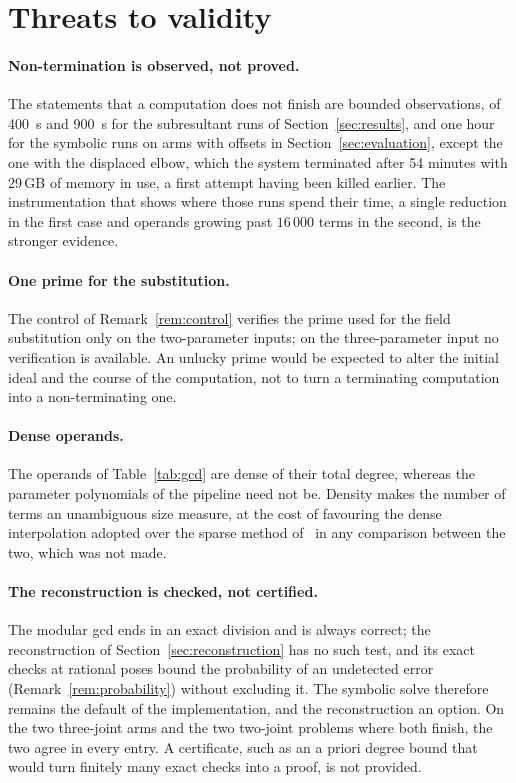 \documentclass[11pt,a4paper]{article}
\theoremstyle{plain}
\theoremstyle{definition}
\theoremstyle{remark}
\begin{document}
\section{Threats to validity}
\label{sec:threats}

\paragraph{Non-termination is observed, not proved.} The statements that a computation does not
finish are bounded observations, of \SI{400}{\second} and \SI{900}{\second} for the subresultant runs of
Section~\ref{sec:results}, and one hour for the symbolic runs on arms with offsets in
Section~\ref{sec:evaluation}, except the one with the displaced elbow, which the system terminated
after 54 minutes with 29\,GB of memory in use, a first attempt having been killed earlier. The instrumentation that shows where those runs spend their time, a
single reduction in the first case and operands growing past $16\,000$ terms in the second, is the
stronger evidence.

\paragraph{One prime for the substitution.} The control of Remark~\ref{rem:control} verifies the prime
used for the field substitution only on the two-parameter inputs; on the three-parameter input no
verification is available. An unlucky prime would be expected to alter the initial ideal and the
course of the computation, not to turn a terminating computation into a non-terminating one.

\paragraph{Dense operands.} The operands of Table~\ref{tab:gcd} are dense of their total degree,
whereas the parameter polynomials of the pipeline need not be. Density makes the number of terms an
unambiguous size measure, at the cost of favouring the dense interpolation adopted over the sparse
method of~\cite{zippel1979} in any comparison between the two, which was not made.

\paragraph{The reconstruction is checked, not certified.} The modular gcd ends in an exact division
and is always correct; the reconstruction of Section~\ref{sec:reconstruction} has no such test, and
its exact checks at rational poses bound the probability of an undetected error
(Remark~\ref{rem:probability}) without excluding it. The symbolic solve therefore remains the default
of the implementation, and the reconstruction an option. On the two three-joint arms and the two
two-joint problems where both finish, the two agree in every entry. A certificate, such as an a priori degree bound that would turn finitely many
exact checks into a proof, is not provided.
\end{document}
